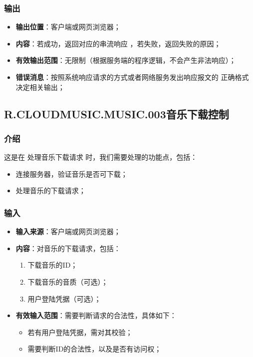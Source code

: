 \subsubsection{输出}
\begin{itemize}
	\item \textbf{输出位置}：客户端或网页浏览器；
	\item \textbf{内容}：若成功，返回对应的串流响应 ，若失败，返回失败的原因；
	\item \textbf{有效输出范围}：无限制（根据服务端的程序逻辑，不会产生非法响应）；
	\item \textbf{错误消息}：按照系统响应请求的方式或者网络服务发出响应报文的
		正确格式决定相关输出；
\end{itemize}

\subsection{R.CLOUDMUSIC.MUSIC.003音乐下载控制}
\subsubsection{介绍}
	这是在 处理音乐下载请求 时，我们需要处理的功能点，包括：
	\begin{itemize}
		\item 连接服务器，验证音乐是否可下载；
		\item 处理音乐的下载请求；
	\end{itemize}
\subsubsection{输入}
	\begin{itemize}
		\item \textbf{输入来源}：客户端或网页浏览器；
		\item \textbf{内容}：对音乐的下载请求，包括：
		\begin{enumerate}
			\item 下载音乐的ID；
			\item 下载音乐的音质（可选）；
			\item 用户登陆凭据（可选）；
		\end{enumerate}
		\item \textbf{有效输入范围}：需要判断请求的合法性，具体如下：
		\begin{itemize}
			\item 若有用户登陆凭据，需对其校验； 
			\item 需要判断ID的合法性，以及是否有访问权；
		\end{itemize}
	\end{itemize}
